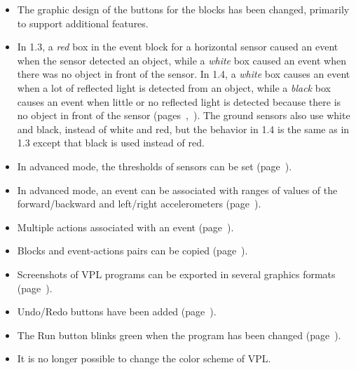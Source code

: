 \begin{itemize}

\item The graphic design of the buttons for the blocks has been changed,
primarily to support additional features.

\item In 1.3, a \emph{red} box in the event block for a horizontal
sensor caused an event when the sensor detected an object, while a
\emph{white} box caused an event when there was no object in front of
the sensor. In 1.4, a \emph{white} box causes an event when a lot of
reflected light is detected from an object, while a \emph{black} box
causes an event when little or no reflected light is detected because
there is no object in front of the sensor
(pages~\pageref{p.proximity-colors1},~\pageref{p.proximity-colors2}).
The ground sensors also use white and black, instead of white and red,
but the behavior in 1.4 is the same as in 1.3 except that black is used
instead of red.

\item In advanced mode, the thresholds of sensors can be
set (page~\pageref{p.proximity-sensitivity}).

\item In advanced mode, an event can be associated with ranges of values
of the forward/backward and left/right accelerometers
(page~\pageref{p.accel}).

\item Multiple actions associated with an event (page~\pageref{p.multiple}).

\item Blocks and event-actions pairs can be copied
(page~\pageref{p.copy-pairs}).

\item Screenshots of VPL programs can be exported in several
 graphics formats (page~\pageref{p.export}).

\item Undo/Redo buttons have been added (page~\pageref{p.undo}).

\item The Run button blinks green when the program has been changed
(page~\pageref{p.blink}).

\item It is no longer possible to change the color scheme of VPL.

\end{itemize}
